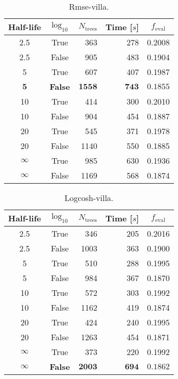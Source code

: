  \begin{table}[]
  \begin{tabular}{@{}ccrrc@{}}
    Half-life & $\log_{10}$ & $N_\mathrm{trees}$ & Time [$s$] & $f_\mathrm{eval}$ \\
    \midrule
    \num{2.5} & True & \num{363} & \num{278} & \num{0.2008} \\
    \num{2.5} & False & \num{905} & \num{483} & \num{0.1904} \\
    \num{5} & True & \num{607} & \num{407} & \num{0.1987} \\
    $\mathbf{5}$ & \textbf{False} & $\mathbf{1558}$ & $\mathbf{743}$ & $\mathbf{0.1855}$ \\
    \num{10} & True & \num{414} & \num{300} & \num{0.2010} \\
    \num{10} & False & \num{904} & \num{454} & \num{0.1887} \\
    \num{20} & True & \num{545} & \num{371} & \num{0.1978} \\
    \num{20} & False & \num{1140} & \num{550} & \num{0.1885} \\
    $\infty$ & True & \num{985} & \num{630} & \num{0.1936} \\
    $\infty$ & False & \num{1169} & \num{568} & \num{0.1874} \\
  \end{tabular}
  \caption{\label{tab:h:HPO_initial_Rmse-villa}Rmse-villa.}
\end{table}


\begin{table}[]
  \begin{tabular}{@{}ccrrc@{}}
    Half-life & $\log_{10}$ & $N_\mathrm{trees}$ & Time [$s$] & $f_\mathrm{eval}$ \\
    \midrule
    \num{2.5} & True & \num{346} & \num{205} & \num{0.2016} \\
    \num{2.5} & False & \num{1003} & \num{363} & \num{0.1900} \\
    \num{5} & True & \num{510} & \num{288} & \num{0.1995} \\
    \num{5} & False & \num{984} & \num{367} & \num{0.1870} \\
    \num{10} & True & \num{572} & \num{303} & \num{0.1992} \\
    \num{10} & False & \num{1162} & \num{419} & \num{0.1874} \\
    \num{20} & True & \num{424} & \num{240} & \num{0.1995} \\
    \num{20} & False & \num{1263} & \num{454} & \num{0.1871} \\
    $\infty$ & True & \num{373} & \num{220} & \num{0.1992} \\
    $\bm{\infty}$ & \textbf{False} & $\mathbf{2003}$ & $\mathbf{694}$ & $\mathbf{0.1862}$ \\
  \end{tabular}
  \caption{\label{tab:h:HPO_initial_Logcosh-villa}Logcosh-villa.}
\end{table}

